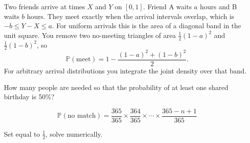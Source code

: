 \documentclass{report}
\begin{document}
\begin{sol}
    
Two friends arrive at times $X$ and $Y$ on $[0,1]$.
Friend A waits $a$ hours and B waits $b$ hours.  
They meet exactly when the arrival intervals overlap, which is
$-b \le Y-X \le a$.  
For uniform arrivals this is the area of a diagonal band in the unit square.
You remove two no-meeting triangles of area $\tfrac12(1-a)^2$ and
$\tfrac12(1-b)^2$, so  
\[
\mathbb{P}(\text{meet}) = 1 - \frac{(1-a)^2 + (1-b)^2}{2}.
\]
For arbitrary arrival distributions you integrate the joint density over that
band.

\centering
{}

\end{sol}

{
    How many people are needed so that the probability of at least one shared birthday is 50\%?
}

\begin{sol}
    \[
    \mathbb{P}(\text{no match})=\frac{365}{365}\times \frac{364}{365}\times\cdots \times \frac{365-n+1}{365}
    \]

    Set equal to $\frac{1}{2}$, solve numerically.
\end{sol}
\end{document}
